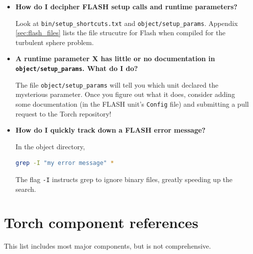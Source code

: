 \documentclass[10pt]{article}
\begin{document}
\begin{itemize}

    \item \textbf{How do I decipher FLASH setup calls and runtime parameters?}

	Look at \texttt{bin/setup\_shortcuts.txt} and \texttt{object/setup\_params}. 
	Appendix \ref{sec:flash_files} lists the file strucutre for Flash when compiled
	for the turbulent sphere problem.

    \item \textbf{A runtime parameter X has little or no documentation in
        \texttt{object/setup\_params}.  What do I do?}

        The file \texttt{object/setup\_params} will tell you which unit
        declared the mysterious parameter.  Once you figure out what it does,
        consider adding some documentation (in the FLASH unit's \texttt{Config}
        file) and submitting a pull request to the Torch repository!

    \item \textbf{How do I quickly track down a FLASH error message?}

        In the object directory,
\begin{lstlisting}[language=bash]
grep -I "my error message" *
\end{lstlisting}
        The flag \texttt{-I} instructs grep to ignore binary files, greatly
        speeding up the search.

\end{itemize}

\appendix
\section{Torch component references}
\label{sec:components}

This list includes most major components, but is not comprehensive.
\end{document}

